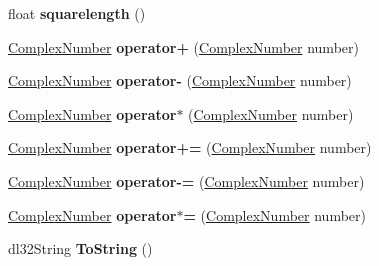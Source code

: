\begin{DoxyCompactItemize}
\item 
\hypertarget{struct_complex_number_aaa7d4cf7ff15026615ba8e98f8454b48}{float {\bfseries squarelength} ()}\label{struct_complex_number_aaa7d4cf7ff15026615ba8e98f8454b48}

\item 
\hypertarget{struct_complex_number_a6d9c774a96a69eb92907458ac4fc9127}{\hyperlink{struct_complex_number}{Complex\-Number} {\bfseries operator+} (\hyperlink{struct_complex_number}{Complex\-Number} number)}\label{struct_complex_number_a6d9c774a96a69eb92907458ac4fc9127}

\item 
\hypertarget{struct_complex_number_a377a97aa85d588c05cf5ca1c32ac3d6e}{\hyperlink{struct_complex_number}{Complex\-Number} {\bfseries operator-\/} (\hyperlink{struct_complex_number}{Complex\-Number} number)}\label{struct_complex_number_a377a97aa85d588c05cf5ca1c32ac3d6e}

\item 
\hypertarget{struct_complex_number_aa391af9511166fb276132dbfc0bb18dd}{\hyperlink{struct_complex_number}{Complex\-Number} {\bfseries operator$\ast$} (\hyperlink{struct_complex_number}{Complex\-Number} number)}\label{struct_complex_number_aa391af9511166fb276132dbfc0bb18dd}

\item 
\hypertarget{struct_complex_number_a7082c0a0ae5106e0884a7f6f0e457599}{\hyperlink{struct_complex_number}{Complex\-Number} {\bfseries operator+=} (\hyperlink{struct_complex_number}{Complex\-Number} number)}\label{struct_complex_number_a7082c0a0ae5106e0884a7f6f0e457599}

\item 
\hypertarget{struct_complex_number_aa7a333e7d15bb9f8c47769524aee286f}{\hyperlink{struct_complex_number}{Complex\-Number} {\bfseries operator-\/=} (\hyperlink{struct_complex_number}{Complex\-Number} number)}\label{struct_complex_number_aa7a333e7d15bb9f8c47769524aee286f}

\item 
\hypertarget{struct_complex_number_ad7aa3969959bbfc6815a2125dbcaeed5}{\hyperlink{struct_complex_number}{Complex\-Number} {\bfseries operator$\ast$=} (\hyperlink{struct_complex_number}{Complex\-Number} number)}\label{struct_complex_number_ad7aa3969959bbfc6815a2125dbcaeed5}

\item 
\hypertarget{struct_complex_number_ab9b87dbdd5c00c08cc8764ebdbb67425}{dl32\-String {\bfseries To\-String} ()}\label{struct_complex_number_ab9b87dbdd5c00c08cc8764ebdbb67425}

\end{DoxyCompactItemize}
